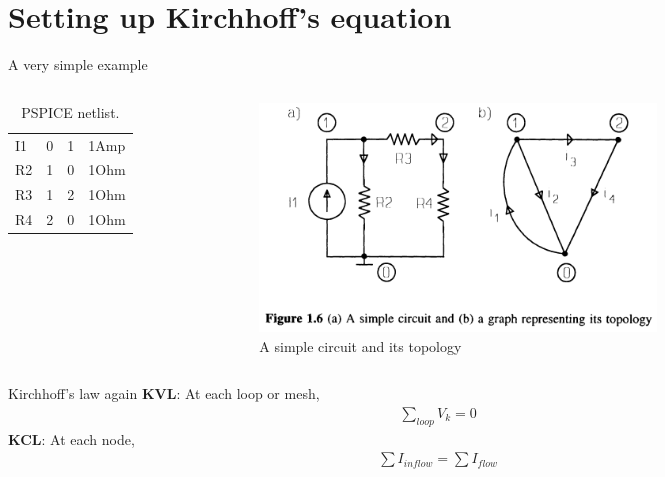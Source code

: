 \documentclass[xcolor=dvipsnames]{beamer}
\begin{document}
\section{Setting up Kirchhoff's equation}

\begin{frame}{A very simple example}
    \begin{columns}
        \begin{column}{.45\textwidth}
            \begin{table}[h!]
	    	\caption{PSPICE netlist.}
	    	\label{tab:netlist}
	   		 \begin{tabular}{l|l|l|l} %
	      		\hline
	      		I1 & 0 & 1 & 1Amp\\
	      		R2 & 1 & 0 & 1Ohm\\
	      		R3 & 1 & 2 & 1Ohm\\
	      		R4 & 2 & 0 & 1Ohm
	    	\end{tabular}
			\end{table}
        \end{column}
		\begin{column}{.75\textwidth}
         \begin{figure}[!ht]
  			\centering
    		\includegraphics[width=0.7\textwidth]{circuitt.png}
   			 \caption[figure 4]{A simple circuit and its topology}
    		\label{fig:eg4}
    	 \end{figure}
      	\end{column}
    \end{columns}
\end{frame}

\begin{frame}{Kirchhoff's law again}
	\textbf{KVL}: At each loop or mesh,
	\begin{align*}
		\sum_{loop} V_k = 0
	\end{align*}
	\textbf{KCL}: At each node,
	\begin{align*}
		\sum I_{inflow} = \sum I_{flow}
	\end{align*}

\end{frame}
\end{document}
